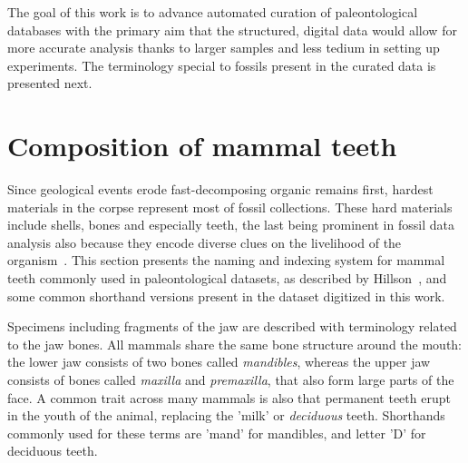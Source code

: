 \documentclass[english,twoside,openright]{UH_DS_MSc}
\begin{document}
The goal of this work is to advance automated curation of paleontological databases
with the primary aim that the structured, digital data would allow for 
more accurate analysis thanks to larger samples and less tedium in 
setting up experiments. The terminology special to fossils present in 
the curated data is presented next.

\section{Composition of mammal teeth}
\label{sect:mammal_teeth}


Since geological events erode fast-decomposing organic remains first, hardest materials in 
the corpse represent most of fossil collections. These hard materials include shells, bones and especially teeth, the last being prominent in fossil data analysis also because they encode diverse clues on 
the livelihood of the organism~\cite{Faith_Lyman_2019}.
This section presents the naming and indexing system for mammal teeth commonly used in paleontological datasets,
as described by Hillson~\cite{Hillson_2005}, and some common shorthand versions present in the dataset digitized in this work.

Specimens including fragments of the jaw are described with terminology related 
to the jaw bones. All mammals share the same bone structure around the mouth: the lower jaw consists 
of two bones called \textit{mandibles}, whereas the upper jaw consists of bones called 
\textit{maxilla} and \textit{premaxilla}, that also form large parts of the face.
A common trait across many mammals is also that permanent teeth erupt in the 
youth of the animal, replacing the 'milk' or \textit{deciduous} teeth. Shorthands commonly used for these 
terms are 'mand' for mandibles, and letter 'D' for deciduous teeth.
\end{document}
